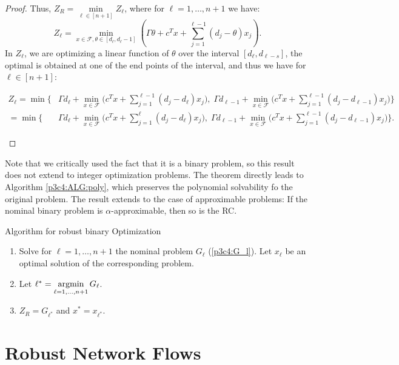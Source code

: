 \begin{proof}
Thus,  $Z_R = \min\limits_{\ell\in[n+1]}Z_\ell$, where for $\ell=1,\dots,n+1$ we have:
\[ Z_\ell = \min\limits_{x\in \mathcal{F},\theta\in [d_\ell,d_\ell-1]}\left(\Gamma\theta+c^Tx+\sum\limits_{j=1}^{\ell-1}(d_j-\theta)x_j\right).\]
In $Z_\ell$, we are optimizing a linear function of $\theta$ over the interval $[d_\ell,d_{\ell-s}]$, the optimal is obtained at one of the end points of the interval, and thus we have for $\ell\in[n+1]$:
\begin{small}
\begin{align*}
Z_\ell =\min\Biggl\{ &\Gamma d_\ell + \min\limits_{x\in \mathcal{F}} \biggl(c^Tx+\sum\limits_{j=1}^{\ell-1}(d_j-d_\ell)x_j\biggr),\;\Gamma d_{\ell-1}+\min\limits_{x\in \mathcal{F}}\biggl( c^Tx+\sum\limits_{j=1}^{\ell-1}(d_j-d_{\ell-1})x_j\biggr)\Biggl\} \\
	=\min\Biggl\{ &\Gamma d_\ell + \min\limits_{x\in \mathcal{F}} \biggl(c^Tx+\sum\limits_{j=1}^{\ell}(d_j-d_\ell)x_j\biggr),\;\Gamma d_{\ell-1}+\min\limits_{x\in \mathcal{F}}\biggl( c^Tx+\sum\limits_{j=1}^{\ell-1}(d_j-d_{\ell-1})x_j\biggr)\Biggl\} .
\end{align*}\end{small}
\end{proof}

Note that we critically used the fact that it is a binary problem, so this result does not extend to integer optimization problems. The theorem directly leads to Algorithm \eqref{p3c4:ALG:poly}, which preserves the polynomial solvability fo the original problem. The result extends to the case of approximable problems: If the nominal binary problem is $\alpha$-approximable, then so is the RC.

\begin{algorithm}{Algorithm for robust binary Optimization}\label{p3c4:ALG:poly}\leavevmode
\begin{enumerate} %
	\item Solve for $ \ell=1,\dots,n+1$ the nominal problem $G_\ell$ (\ref{p3c4:G_l}). Let $x_\ell$ be an optimal solution of the corresponding problem.
	\item Let $\ell^* = \mathop{\rm argmin}\limits_{\ell=1,\dots,n+1} G_\ell$.
	\item $Z_R=G_{\ell^*}$ and $x^* = x_{\ell^*}$.
\end{enumerate}
\end{algorithm}

\section{Robust Network Flows}

